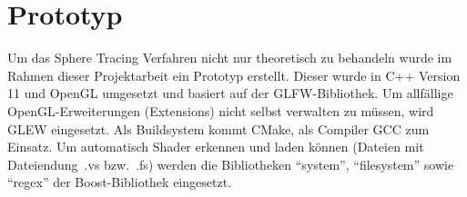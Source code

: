 
\chapter{Prototyp}
\label{chap:prototype}

Um das Sphere Tracing Verfahren nicht nur theoretisch zu behandeln
wurde im Rahmen dieser Projektarbeit ein Prototyp erstellt.  Dieser
wurde in C++ Version 11 und OpenGL umgesetzt und basiert auf der
GLFW-Bibliothek. Um allfällige OpenGL-Erweiterungen (Extensions) nicht
selbst verwalten zu müssen, wird GLEW eingesetzt. Als Buildsystem kommt
CMake, als Compiler GCC zum Einsatz. Um automatisch Shader erkennen und
laden können (Dateien mit Dateiendung~.vs bzw.~.fs) werden die
Bibliotheken ``system'',  ``filesystem'' sowie ``regex'' der
Boost-Bibliothek eingesetzt.




